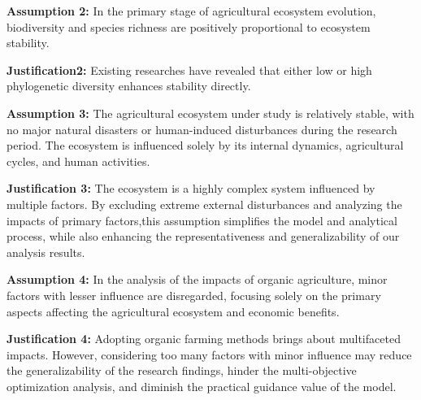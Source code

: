 \documentclass[12pt]{article}
\begin{document}
	\textbf{Assumption 2: }In the primary stage of agricultural ecosystem evolution, biodiversity and species richness are positively proportional to ecosystem stability.
	
	\textbf{Justification2: }Existing researches \cite{1} \cite{2} \cite{3} have revealed that either low or high phylogenetic diversity enhances stability directly.
	
	\textbf{Assumption 3: }The agricultural ecosystem under study is relatively stable, with no major natural disasters or human-induced disturbances during the research period. The ecosystem is influenced solely by its internal dynamics, agricultural cycles, and human activities.
	
	\textbf{Justification 3: }The ecosystem is a highly complex system influenced by multiple factors. By excluding extreme external disturbances and analyzing the impacts of primary factors,this assumption simplifies the model and analytical process, while also enhancing the representativeness and generalizability of our analysis results.
	
	\textbf{Assumption 4: }In the analysis of the impacts of organic agriculture, minor factors with lesser influence are disregarded, focusing solely on the primary aspects affecting the agricultural ecosystem and economic benefits.
	
	\textbf{Justification 4: }Adopting organic farming methods brings about multifaceted impacts. However, considering too many factors with minor influence may reduce the generalizability of the research findings, hinder the multi-objective optimization analysis, and diminish the practical guidance value of the model.
	
	
\end{document}
